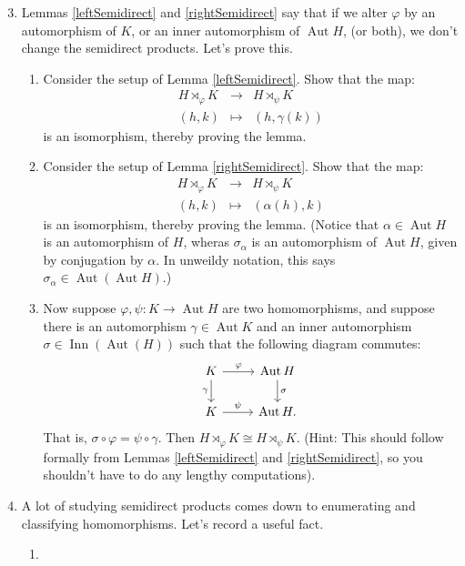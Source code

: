 \documentclass[11pt]{article}
\newcommand{\Aut}{\operatorname{Aut}}
\newcommand{\Inn}{\operatorname{Inn}}
\begin{document}
\begin{enumerate}
  \setcounter{enumi}{2}
  \item{Lemmas \ref{leftSemidirect} and \ref{rightSemidirect} say that if we alter $\varphi$ by an automorphism of $K$, or an inner automorphism of $\Aut H$, (or both), we don't change the semidirect products.  Let's prove this.
  \begin{enumerate}
    \item{
    Consider the setup of Lemma \ref{leftSemidirect}.  Show that the map:
    \begin{eqnarray*}
      H\rtimes_\varphi K&\longrightarrow& H\rtimes_\psi K\\
      (h,k)&\mapsto&(h,\gamma(k))
    \end{eqnarray*}
    is an isomorphism, thereby proving the lemma.
    }
    \item{
    Consider the setup of Lemma \ref{rightSemidirect}.  Show that the map:
    \begin{eqnarray*}
      H\rtimes_\varphi K&\longrightarrow&H\rtimes_\psi K\\
      (h,k) &\mapsto& (\alpha(h),k)
    \end{eqnarray*}
    is an isomorphism, thereby proving the lemma.  (Notice that $\alpha\in\Aut H$ is an automorphism of $H$, wheras $\sigma_\alpha$ is an automorphism of $\Aut H$, given by conjugation by $\alpha$.  In unweildy notation, this says $\sigma_\alpha\in\Aut(\Aut H)$.)
    }
    \item{
    Now suppose $\varphi,\psi:K\to\Aut H$ are two homomorphisms, and suppose there is an automorphism $\gamma\in\Aut K$ and an inner automorphism $\sigma\in\Inn(\Aut(H))$ such that the following diagram commutes:
    \[
    \begin{tikzcd}
      K\ar[r,"\varphi"]\ar[d,swap,"\gamma"]&\Aut H\ar[d,"\sigma"]\\
      K\ar[r,"\psi"]&\Aut H.
    \end{tikzcd}
    \]
    That is, $\sigma\circ\varphi = \psi\circ\gamma$.  Then $H\rtimes_\varphi K\cong H\rtimes_\psi K$.  (Hint: This should follow formally from Lemmas \ref{leftSemidirect} and \ref{rightSemidirect}, so you shouldn't have to do any lengthy computations).
    }
  \end{enumerate}
  }
  \item{
  A lot of studying semidirect products comes down to enumerating and classifying homomorphisms.  Let's record a useful fact.
  \begin{enumerate}
    \item{
}
\end{enumerate}}
\end{enumerate}
\end{document}
